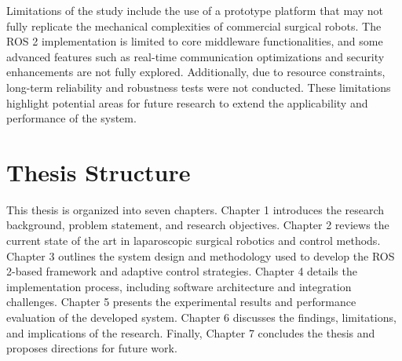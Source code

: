 Limitations of the study include the use of a prototype platform that may not fully replicate the mechanical complexities of commercial surgical robots. The ROS 2 implementation is limited to core middleware functionalities, and some advanced features such as real-time communication optimizations and security enhancements are not fully explored. Additionally, due to resource constraints, long-term reliability and robustness tests were not conducted. These limitations highlight potential areas for future research to extend the applicability and performance of the system.

\section{Thesis Structure}
\label{section:thesis_structure}

This thesis is organized into seven chapters. Chapter 1 introduces the research background, problem statement, and research objectives. Chapter 2 reviews the current state of the art in laparoscopic surgical robotics and control methods. Chapter 3 outlines the system design and methodology used to develop the ROS 2-based framework and adaptive control strategies. Chapter 4 details the implementation process, including software architecture and integration challenges. Chapter 5 presents the experimental results and performance evaluation of the developed system. Chapter 6 discusses the findings, limitations, and implications of the research. Finally, Chapter 7 concludes the thesis and proposes directions for future work.
